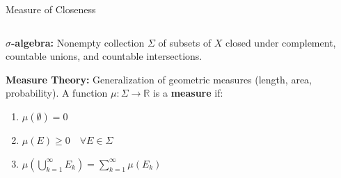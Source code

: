 \documentclass[aspectratio=169,xcolor=dvipsnames,svgnames,x11names,fleqn]{beamer}
\begin{document}
\begin{frame}{Measure of Closeness}
\begin{columns}[T]
        \begin{column}{0.5\textwidth}
            \begin{tcolorbox}[
                enhanced,
                colback=gray!5, 
                colframe=gray!80,
                title=\footnotesize Formality: $\sigma$-algebra \& Measure,
                fonttitle=\bfseries,
                boxrule=0.5pt
            ]
            \tiny
            \textbf{$\sigma$-algebra:} Nonempty collection $\Sigma$ of subsets of $X$ closed under complement, countable unions, and countable intersections. 
            
            \vspace{0.1cm}
            \textbf{Measure Theory:} Generalization of geometric measures (length, area, probability). A function $\mu: \Sigma \to \mathbb{R}$ is a \textbf{measure} if:
            \begin{enumerate}
                \item $\mu(\emptyset) = 0$
                \item $\mu(E) \geq 0 \quad \forall E \in \Sigma$
                \item $\mu(\bigcup_{k=1}^\infty E_k) = \sum_{k=1}^\infty \mu(E_k)$
            \end{enumerate}
            \end{tcolorbox}
            

        \end{column}
    \end{columns}
\end{frame}
\end{document}
